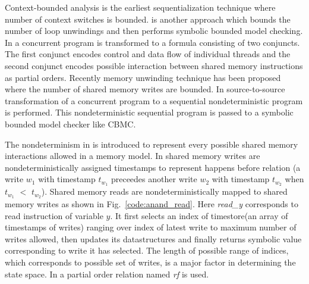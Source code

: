 \documentclass{llncs}
\begin{document}
Context-bounded analysis\cite{kiss,lal} is the earliest sequentialization technique where number of context switches is bounded.\cite{alglave} is another approach which bounds the number of loop unwindings and then performs symbolic bounded model checking. In \cite{alglave} a concurrent program is transformed to a formula consisting of two conjuncts. The first conjunct encodes control and data flow of individual threads and the second conjunct encodes possible interaction between shared memory instructions as partial orders. Recently memory unwinding technique\cite{tomasco}\cite{anand} has been proposed where the number of shared memory writes are bounded. In \cite{tomasco}\cite{anand} source-to-source transformation of a concurrent program to a sequential nondeterministic program is performed. This nondeterministic sequential program is passed to a symbolic bounded model checker like CBMC\cite{cbmc}. 

The nondeterminism in \cite{alglave}\cite{tomasco}\cite{anand} is introduced to represent every possible shared memory interactions allowed in a memory model. In \cite{anand} shared memory writes are nondeterministically assigned timestamps to represent happens before relation (a write \textit{$w_1$} with timestamp \textit{$t_{w_1}$} preceedes another write \textit{$w_2$} with timestamp \textit{$t_{w_2}$} when \textit{$t_{w_1}$} $<$ \textit{$t_{w_2}$}). Shared memory reads are nondeterministically mapped to shared memory writes as shown in Fig.~\ref{code:anand_read}. Here \textit{read\_y} corresponds to read instruction of variable \textit{$y$}. It first selects an index of timestore(an array of timestamps of writes) ranging over index of latest write to maximum number of writes allowed, then updates its datastructures and finally returns symbolic value corresponding to write it has selected. The length of possible range of indices, which corresponds to possible set of writes, is a major factor in determining the state space. In \cite{alglave} a partial order relation named \textit{rf} is used.
\end{document}
